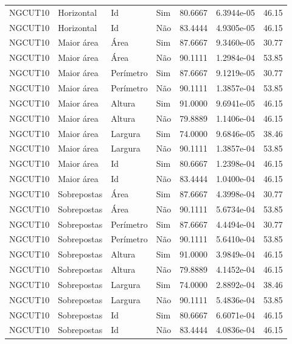 \begin{tabular}{llllrrr}
    NGCUT10   & Horizontal  & Id        & Sim         & 80.6667      & 6.3944e-05 & 46.15    \\
    NGCUT10   & Horizontal  & Id        & Não         & 83.4444      & 4.9305e-05 & 46.15    \\
    NGCUT10   & Maior área  & Área      & Sim         & 87.6667      & 9.3460e-05 & 30.77    \\
    NGCUT10   & Maior área  & Área      & Não         & 90.1111      & 1.2984e-04 & 53.85    \\
    NGCUT10   & Maior área  & Perímetro & Sim         & 87.6667      & 9.1219e-05 & 30.77    \\
    NGCUT10   & Maior área  & Perímetro & Não         & 90.1111      & 1.3857e-04 & 53.85    \\
    NGCUT10   & Maior área  & Altura    & Sim         & 91.0000      & 9.6941e-05 & 46.15    \\
    NGCUT10   & Maior área  & Altura    & Não         & 79.8889      & 1.1406e-04 & 46.15    \\
    NGCUT10   & Maior área  & Largura   & Sim         & 74.0000      & 9.6846e-05 & 38.46    \\
    NGCUT10   & Maior área  & Largura   & Não         & 90.1111      & 1.3857e-04 & 53.85    \\
    NGCUT10   & Maior área  & Id        & Sim         & 80.6667      & 1.2398e-04 & 46.15    \\
    NGCUT10   & Maior área  & Id        & Não         & 83.4444      & 1.0400e-04 & 46.15    \\
    NGCUT10   & Sobrepostas & Área      & Sim         & 87.6667      & 4.3998e-04 & 30.77    \\
    NGCUT10   & Sobrepostas & Área      & Não         & 90.1111      & 5.6734e-04 & 53.85    \\
    NGCUT10   & Sobrepostas & Perímetro & Sim         & 87.6667      & 4.4494e-04 & 30.77    \\
    NGCUT10   & Sobrepostas & Perímetro & Não         & 90.1111      & 5.6410e-04 & 53.85    \\
    NGCUT10   & Sobrepostas & Altura    & Sim         & 91.0000      & 3.9849e-04 & 46.15    \\
    NGCUT10   & Sobrepostas & Altura    & Não         & 79.8889      & 4.1452e-04 & 46.15    \\
    NGCUT10   & Sobrepostas & Largura   & Sim         & 74.0000      & 2.8892e-04 & 38.46    \\
    NGCUT10   & Sobrepostas & Largura   & Não         & 90.1111      & 5.4836e-04 & 53.85    \\
    NGCUT10   & Sobrepostas & Id        & Sim         & 80.6667      & 6.6071e-04 & 46.15    \\
    NGCUT10   & Sobrepostas & Id        & Não         & 83.4444      & 4.0836e-04 & 46.15    \\
    \hline
\end{tabular}